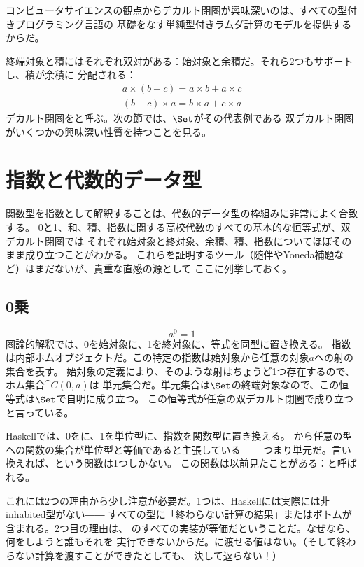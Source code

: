 コンピュータサイエンスの観点からデカルト閉圏が興味深いのは、すべての型付きプログラミング言語の
基礎をなす単純型付きラムダ計算のモデルを提供するからだ。

終端対象と積にはそれぞれ双対がある：始対象と余積だ。それら2つもサポートし、積が余積に
分配される：
\begin{gather*}
  a \times (b + c) = a \times b + a \times c \\
  (b + c) \times a = b \times a + c \times a
\end{gather*}
デカルト閉圏をと呼ぶ。次の節では、$\Set$がその代表例である
双デカルト閉圏がいくつかの興味深い性質を持つことを見る。

\section{指数と代数的データ型}

関数型を指数として解釈することは、代数的データ型の枠組みに非常によく合致する。
0と1、和、積、指数に関する高校代数のすべての基本的な恒等式が、双デカルト閉圏では
それぞれ始対象と終対象、余積、積、指数についてほぼそのまま成り立つことがわかる。
これらを証明するツール（随伴やYoneda補題など）はまだないが、貴重な直感の源として
ここに列挙しておく。

\subsection{0乗}

\[a^{0} = 1\]
圏論的解釈では、0を始対象に、1を終対象に、等式を同型に置き換える。
指数は内部ホムオブジェクトだ。この特定の指数は始対象から任意の対象$a$への射の集合を表す。
始対象の定義により、そのような射はちょうど1つ存在するので、ホム集合$\cat{C}(0, a)$は
単元集合だ。単元集合は$\Set$の終端対象なので、この恒等式は$\Set$で自明に成り立つ。
この恒等式が任意の双デカルト閉圏で成り立つと言っている。

Haskellでは、0をに、1を単位型\code{()}に、指数を関数型に置き換える。
から任意の型への関数の集合が単位型と等価であると主張している――
つまり単元だ。言い換えれば、という関数は1つしかない。
この関数は以前見たことがある：と呼ばれる。

これには2つの理由から少し注意が必要だ。1つは、Haskellには実際には非inhabited型がない――
すべての型に「終わらない計算の結果」またはボトムが含まれる。2つ目の理由は、
のすべての実装が等価だということだ。なぜなら、何をしようと誰もそれを
実行できないからだ。に渡せる値はない。（そして終わらない計算を渡すことができたとしても、
決して返らない！）


